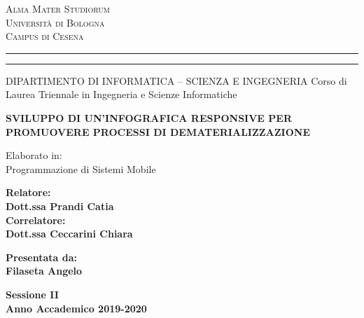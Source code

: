 \oddsidemargin=25pt
\begin{titlepage}
\begin{center}
	{{\Large{\textsc{Alma Mater Studiorum}}}\\
	{\Large{\textsc{Universit\`a di Bologna}}} \\
	{\textsc{Campus di Cesena}} \rule[0.1cm]{14cm}{0.1mm}
			\rule[0.5cm]{14cm}{0.6mm}
	DIPARTIMENTO DI INFORMATICA – SCIENZA E INGEGNERIA
	Corso di Laurea Triennale in Ingegneria e Scienze Informatiche }
\end{center}
\vspace{15mm}
\begin{center}
	{\LARGE{\bf SVILUPPO DI UN'INFOGRAFICA RESPONSIVE PER PROMUOVERE PROCESSI DI DEMATERIALIZZAZIONE
	}}\\
	\vspace{3mm}
\end{center}
\vspace{10mm}
\begin{center}
	{\large{ Elaborato in:\\Programmazione di Sistemi Mobile\\}}
\end{center}
\vspace{20mm}
\par
\noindent
\begin{minipage}[t]{0.47\textwidth}
	{\large{\bf Relatore:\\Dott.ssa Prandi Catia\\}
	{\bf Correlatore:\\Dott.ssa Ceccarini Chiara}}
\end{minipage}
\hfill
\begin{minipage}[t]{0.47\textwidth}\raggedleft
	{\large{\bf Presentata da:\\Filaseta Angelo}}
\end{minipage}
\vspace{20mm}
\begin{center}
	{\large{\bf Sessione II\\Anno Accademico 2019-2020}}
\end{center}
\end{titlepage}
